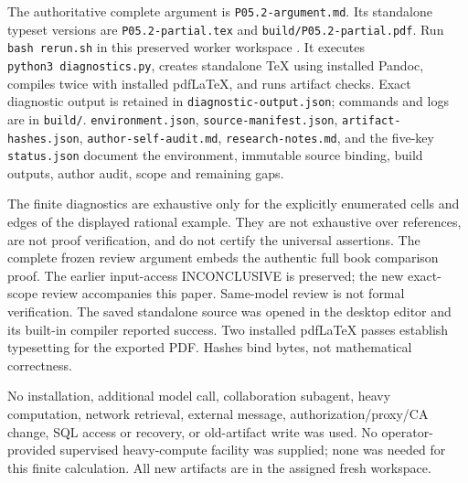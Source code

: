 \documentclass[
  10pt,
]{article}
\begin{document}
The authoritative complete argument is \texttt{P05.2-argument.md}. Its
standalone typeset versions are \texttt{P05.2-partial.tex} and
\texttt{build/P05.2-partial.pdf}. Run \texttt{bash\ rerun.sh} in this
preserved worker workspace
.
It executes \texttt{python3\ diagnostics.py}, creates
standalone TeX using installed Pandoc, compiles twice with installed
pdfLaTeX, and runs artifact checks. Exact diagnostic output is retained
in \texttt{diagnostic-output.json}; commands and logs are in
\texttt{build/}. \texttt{environment.json},
\texttt{source-manifest.json}, \texttt{artifact-hashes.json},
\texttt{author-self-audit.md}, \texttt{research-notes.md}, and the
five-key \texttt{status.json} document the environment, immutable source
binding, build outputs, author audit, scope and remaining gaps.

The finite diagnostics are exhaustive only for the explicitly enumerated
cells and edges of the displayed rational example. They are not
exhaustive over references, are not proof verification, and do not
certify the universal assertions. The complete frozen review argument embeds the authentic full book
comparison proof. The earlier input-access INCONCLUSIVE is preserved;
the new exact-scope review accompanies this paper. Same-model review
is not formal verification. The saved standalone source was opened in the desktop editor
and its built-in compiler reported success. Two installed pdfLaTeX
passes establish typesetting for the exported PDF. Hashes bind bytes, not mathematical correctness.

No installation, additional model call, collaboration subagent, heavy
computation, network retrieval, external message, authorization/proxy/CA
change, SQL access or recovery, or old-artifact write was used. No
operator-provided supervised heavy-compute facility was supplied; none
was needed for this finite calculation. All new artifacts are in the
assigned fresh workspace.
\end{document}
